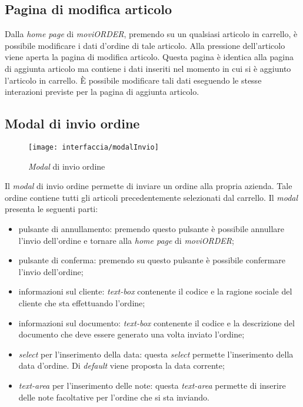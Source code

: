 \subsection{Pagina di modifica articolo}

Dalla \textit{home page} di \textit{moviORDER}, premendo su un qualsiasi articolo in carrello, è possibile modificare i dati d'ordine di tale articolo. Alla pressione dell'articolo viene aperta la pagina di modifica articolo. Questa pagina è identica alla pagina di aggiunta articolo ma contiene i dati inseriti nel momento in cui si è aggiunto l'articolo in carrello. È possibile modificare tali dati eseguendo le stesse interazioni previste per la pagina di aggiunta articolo.

\subsection{Modal di invio ordine}

\begin{figure}[!h] 
    \centering 
    \texttt{[image: interfaccia/modalInvio]} 
    \caption{\textit{Modal} di invio ordine}
\end{figure}

Il \textit{modal} di invio ordine permette di inviare un ordine alla propria azienda. Tale ordine contiene tutti gli articoli precedentemente selezionati dal carrello. Il \textit{modal} presenta le seguenti parti:
\begin{itemize}
	\item pulsante di annullamento: premendo questo pulsante è possibile annullare l'invio dell'ordine e tornare alla \textit{home page} di \textit{moviORDER};
	\item pulsante di conferma: premendo su questo pulsante è possibile confermare l'invio dell'ordine;
	\item informazioni sul cliente: \textit{text-box} contenente il codice e la ragione sociale del cliente che sta effettuando l'ordine;
	\item informazioni sul documento: \textit{text-box} contenente il codice e la descrizione del documento che deve essere generato una volta inviato l'ordine;
	\item \textit{select} per l'inserimento della data: questa \textit{select} permette l'inserimento della data d'ordine. Di \textit{default} viene proposta la data corrente;
	\item \textit{text-area} per l'inserimento delle note: questa \textit{text-area} permette di inserire delle note facoltative per l'ordine che si sta inviando.
\end{itemize}

